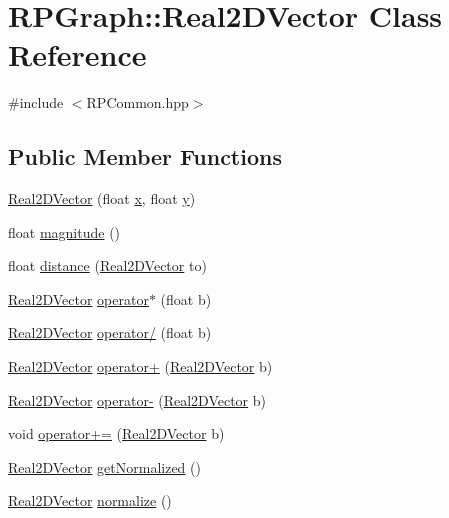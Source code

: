 \hypertarget{classRPGraph_1_1Real2DVector}{}\section{R\+P\+Graph\+:\+:Real2\+D\+Vector Class Reference}
\label{classRPGraph_1_1Real2DVector}


{\ttfamily \#include $<$R\+P\+Common.\+hpp$>$}

\subsection*{Public Member Functions}
\begin{DoxyCompactItemize}
\item 
\mbox{\hyperlink{classRPGraph_1_1Real2DVector_af6c81ec0d227c6cd31047e436bf574d5}{Real2\+D\+Vector}} (float \mbox{\hyperlink{classRPGraph_1_1Real2DVector_a4511632e71344b88deee5512b791e97d}{x}}, float \mbox{\hyperlink{classRPGraph_1_1Real2DVector_aa37f96dfb13727fdee7a82ddbd1d7f60}{y}})
\item 
float \mbox{\hyperlink{classRPGraph_1_1Real2DVector_a62125104c62e26ff29b68c190402bdcb}{magnitude}} ()
\item 
float \mbox{\hyperlink{classRPGraph_1_1Real2DVector_ac4f84d862727a3e3c8d31785c8e6a098}{distance}} (\mbox{\hyperlink{classRPGraph_1_1Real2DVector}{Real2\+D\+Vector}} to)
\item 
\mbox{\hyperlink{classRPGraph_1_1Real2DVector}{Real2\+D\+Vector}} \mbox{\hyperlink{classRPGraph_1_1Real2DVector_aed4dbd7713ff8b99da56fa8921d0b7af}{operator$\ast$}} (float b)
\item 
\mbox{\hyperlink{classRPGraph_1_1Real2DVector}{Real2\+D\+Vector}} \mbox{\hyperlink{classRPGraph_1_1Real2DVector_a4517f945dd9656ab21361d9b5d56acd3}{operator/}} (float b)
\item 
\mbox{\hyperlink{classRPGraph_1_1Real2DVector}{Real2\+D\+Vector}} \mbox{\hyperlink{classRPGraph_1_1Real2DVector_a80a9d932a71d70a67041b3881c9927eb}{operator+}} (\mbox{\hyperlink{classRPGraph_1_1Real2DVector}{Real2\+D\+Vector}} b)
\item 
\mbox{\hyperlink{classRPGraph_1_1Real2DVector}{Real2\+D\+Vector}} \mbox{\hyperlink{classRPGraph_1_1Real2DVector_a465750b796cc19dbc290229c2d78d84d}{operator-\/}} (\mbox{\hyperlink{classRPGraph_1_1Real2DVector}{Real2\+D\+Vector}} b)
\item 
void \mbox{\hyperlink{classRPGraph_1_1Real2DVector_a8d1c5fc6b1d4bd683acfa482677ad58a}{operator+=}} (\mbox{\hyperlink{classRPGraph_1_1Real2DVector}{Real2\+D\+Vector}} b)
\item 
\mbox{\hyperlink{classRPGraph_1_1Real2DVector}{Real2\+D\+Vector}} \mbox{\hyperlink{classRPGraph_1_1Real2DVector_a974b46237ab8f38d195061fd9c5b3357}{get\+Normalized}} ()
\item 
\mbox{\hyperlink{classRPGraph_1_1Real2DVector}{Real2\+D\+Vector}} \mbox{\hyperlink{classRPGraph_1_1Real2DVector_ac96e16721ee48ab5fa1ab686c58651f4}{normalize}} ()
\end{DoxyCompactItemize}
